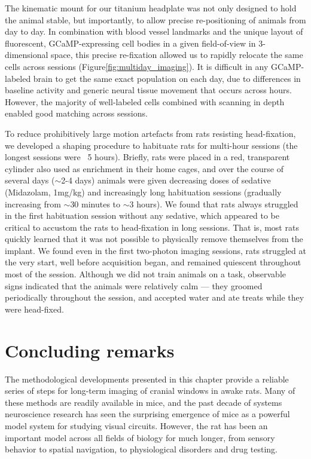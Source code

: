 The kinematic mount for our titanium headplate was not only designed to hold the animal stable, but importantly, to allow precise re-positioning of animals from day to day. In combination with blood vessel landmarks and the unique layout of fluorescent, GCaMP-expressing cell bodies in a given field-of-view in 3-dimensional space, this precise re-fixation allowed us to rapidly relocate the same cells across sessions (Figure\ref{fig:multiday_imaging}). It is difficult in any GCaMP-labeled brain to get the same exact population on each day, due to differences in baseline activity and generic neural tissue movement that occurs across hours. However, the majority of well-labeled cells combined with scanning in depth enabled good matching across sessions. 

To reduce prohibitively large motion artefacts from rats resisting head-fixation, we developed a shaping procedure to habituate rats for multi-hour sessions (the longest sessions were ~5 hours). Briefly, rats were placed in a red, transparent cylinder also used as enrichment in their home cages, and over the course of several days ($\sim$2-4 days) animals were given decreasing doses of sedative (Midazolam, 1mg/kg) and increasingly long habituation sessions (gradually increasing from $\sim$30 minutes to $\sim$3 hours). We found that rats always struggled in the first habituation session without any sedative, which appeared to be critical to accustom the rats to head-fixation in long sessions. That is, most rats quickly learned that it was not possible to physically remove themselves from the implant. We found even in the first two-photon imaging sessions, rats struggled at the very start, well before acquisition began, and remained quiescent throughout most of the session. Although we did not train animals on a task, observable signs indicated that the animals were relatively calm --- they groomed periodically throughout the session, and accepted water and ate treats while they were head-fixed. 

\section{Concluding remarks}
The methodological developments presented in this chapter provide a reliable series of steps for long-term imaging of cranial windows in awake rats. Many of these methods are readily available in mice, and the past decade of systems neuroscience research has seen the surprising emergence of mice as a powerful model system for studying visual circuits. However, the rat has been an important model across all fields of biology for much longer, from sensory behavior\cite{Lashley1930} to spatial navigation\cite{OKeefe1971, Aronov2014, Eichenbaum1990}, to physiological disorders and drug testing. 


